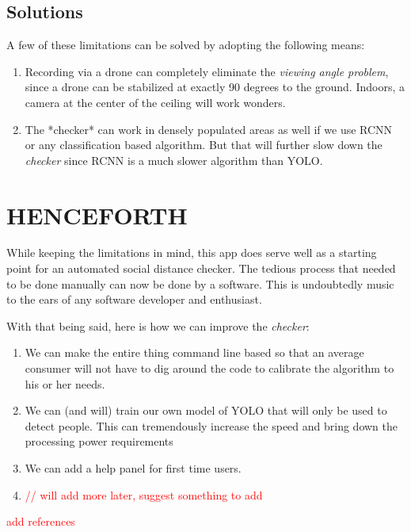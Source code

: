 \documentclass[a4paper]{article}
\begin{document}
\subsection{Solutions}

A few of these limitations can be solved by adopting the following means:

\begin{enumerate}
    \item Recording via a drone can completely eliminate the \textit{viewing angle problem}, since a drone can be stabilized at exactly 90 degrees to the ground. Indoors, a camera at the center of the ceiling will work wonders.
    \item The *checker* can work in densely populated areas as well if we use RCNN or any classification based algorithm. But that will further slow down the \textit{checker} since RCNN is a much slower algorithm than YOLO.
\end{enumerate}

\pagebreak

\section{HENCEFORTH}

While keeping the limitations in mind, this app does serve well as a starting point for an automated social distance checker. The tedious process that needed to be done manually can now be done by a software. This is undoubtedly music to the ears of any software developer and enthusiast.

With that being said, here is how we can improve the \textit{checker}:

\begin{enumerate}
    \item We can make the entire thing command line based so that an average consumer will not have to dig around the code to calibrate the algorithm to his or her needs.
    \item We can (and will) train our own model of YOLO that will only be used to detect people. This can tremendously increase the speed and bring down the processing power requirements
    \item We can add a help panel for first time users.
    \item \textcolor{red}{// will add more later, suggest something to add}
\end{enumerate}

\textcolor{red}{add references}
\end{document}
